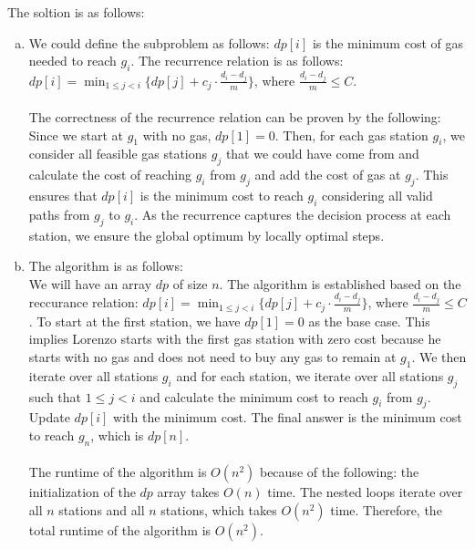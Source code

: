 \documentclass[10pt]{article}
\begin{document}
\begin{solution}
The soltion is as follows:
\begin{enumerate} [(a)]
    \item We could define the subproblem as follows: $dp[i]$ is the minimum cost of gas needed to reach $g_i$. The recurrence relation is as follows: $dp[i] = \min_{1 \leq j < i} \{dp[j] + c_j \cdot \frac{d_i - d_j}{m}\}$, where $\frac{d_i - d_j}{m} \leq C$. \\\\
    The correctness of the recurrence relation can be proven by the following: Since we start at $g_1$ with no gas, $dp[1] = 0$. Then, for each gas station $g_i$, we consider all feasible gas stations $g_j$ that we could have come from and calculate the cost of reaching $g_i$ from $g_j$ and add the cost of gas at $g_j$. This ensures that $dp[i]$ is the minimum cost to reach $g_i$ considering all valid paths from $g_j$ to $g_i$. As the recurrence captures the decision process at each station, we ensure the global optimum by locally optimal steps. \\
    \item The algorithm is as follows: \\We will have an array $dp$ of size $n$. 
    The algorithm is established based on the reccurance relation: $dp[i] = \min_{1 \leq j < i} \{dp[j] + c_j \cdot \frac{d_i - d_j}{m}\}$, where $\frac{d_i - d_j}{m} \leq C$. To start at the first station, we have $dp[1] = 0$ as the base case. This implies Lorenzo starts with the first gas station with zero cost because he starts with no gas and does not need to buy any gas to remain at $g_1$. We then iterate over all stations $g_i$ and for each station, we iterate over all stations $g_j$ such that $1 \leq j < i$ and calculate the minimum cost to reach $g_i$ from $g_j$. Update $dp[i]$ with the minimum cost. The final answer is the minimum cost to reach $g_n$, which is $dp[n]$. \\\\
    The runtime of the algorithm is $O(n^2)$ because of the following: the initialization of the $dp$ array takes $O(n)$ time. The nested loops iterate over all $n$ stations and all $n$ stations, which takes $O(n^2)$ time. Therefore, the total runtime of the algorithm is $O(n^2)$.
\end{enumerate}
\end{solution}


\newpage

\end{document}
